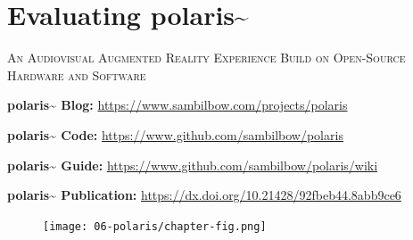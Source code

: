 \chapter{Evaluating polaris\textasciitilde{}}\label{sec: polaris}
\begin{flushright}
    \Large\textsc{An Audiovisual Augmented Reality Experience Build on Open-Source Hardware and Software}
\end{flushright}
\begin{SingleSpace}
    \noindent\textbf{polaris\textasciitilde{} Blog: } \url{https://www.sambilbow.com/projects/polaris}
    
    \noindent\textbf{polaris\textasciitilde{} Code: } \url{https://www.github.com/sambilbow/polaris}
    
    \noindent\textbf{polaris\textasciitilde{} Guide: } \url{https://www.github.com/sambilbow/polaris/wiki}
    
    \noindent\textbf{polaris\textasciitilde{} Publication: } \url{https://dx.doi.org/10.21428/92fbeb44.8abb9ce6}
\end{SingleSpace}

\begin{figure}
    \centering
    \texttt{[image: 06-polaris/chapter-fig.png]}
    \captionsetup{labelformat=empty}
    \caption[\autoref{sec: polaris}: Experience Study of \textit{polaris\textasciitilde{}} at the Sussex Humanities Lab, (from \citeauthor{bilbow2022}, \citeyear{bilbow2022})]{}
\end{figure}

